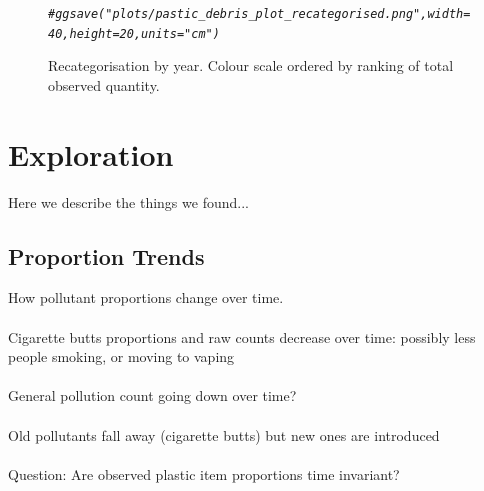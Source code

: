 \documentclass[10pt]{article}\usepackage[]{graphicx}\usepackage[]{color}
\makeatletter
\newcommand{\hlcom}[1]{\textcolor[rgb]{0.678,0.584,0.686}{\textit{#1}}}%
\newenvironment{kframe}{%
 \def\at@end@of@kframe{}%
 \ifinner\ifhmode%
  \def\at@end@of@kframe{\end{minipage}}%
  \begin{minipage}{\columnwidth}%
 \fi\fi%
 \def\FrameCommand##1{\hskip\@totalleftmargin \hskip-\fboxsep
 \colorbox{shadecolor}{##1}\hskip-\fboxsep
     \hskip-\linewidth \hskip-\@totalleftmargin \hskip\columnwidth}%
 \MakeFramed {\advance\hsize-\width
   \@totalleftmargin\z@ \linewidth\hsize
   \@setminipage}}%
 {\par\unskip\endMakeFramed%
 \at@end@of@kframe}
\newenvironment{knitrout}{}{} %
\makeatother
\begin{document}
\begin{figure}[H]
\begin{center}
\begin{knitrout}
\begin{kframe}\begin{alltt}
\hlcom{#ggsave("plots/pastic_debris_plot_recategorised.png", width = 40, height = 20, units = "cm")}
\end{alltt}
\end{kframe}
\end{knitrout}
\caption {Recategorisation by year. Colour scale ordered by ranking of total observed quantity.}
\label{figB}
\end {center}
\end {figure}


















\pagebreak
\section{Exploration}

Here we describe the things we found... 

\subsection{Proportion Trends}
How pollutant proportions change over time.\\
\\
Cigarette butts proportions and raw counts decrease over time: possibly less people smoking, or moving to vaping\\
\\
General pollution count going down over time?\\
\\
Old pollutants fall away (cigarette butts) but new ones are introduced\\
\\
Question: Are observed plastic item proportions time invariant?\\
\\
\end{document}
